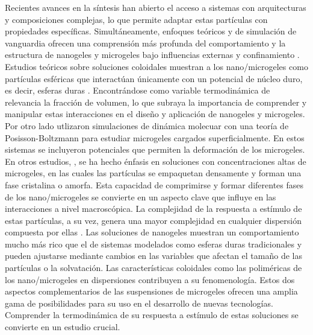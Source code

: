 	Recientes avances en la s\'intesis han abierto el acceso a sistemas con arquitecturas y composiciones complejas, lo que permite adaptar estas part\'iculas con propiedades espec\'ificas. 
	Simult\'aneamente, enfoques te\'oricos y de simulaci\'on de vanguardia ofrecen una comprensi\'on m\'as profunda del comportamiento y la estructura de nanogeles y microgeles bajo influencias externas y confinamiento \cite{perez2021thermodynamic,scotti2022softness,urich2016swelling}. 
	Estudios te\'oricos sobre soluciones coloidales muestran a los nano/microgeles como part\'iculas esf\'ericas que interact\'uan \'unicamente con un potencial de n\'ucleo duro, es decir, esferas duras \cite{karg2019nanogels}. Encontr\'andose como variable termodin\'amica de relevancia la fracci\'on de volumen, lo que subraya la importancia de comprender y manipular estas interacciones en el dise\~no y aplicaci\'on de nanogeles y microgeles.
	Por otro lado \citet{alziyadi2023osmotic} utlizaron simulaciones de din\'amica molecuar con una teor\'ia de Posisson-Boltzmann para estudiar microgeles cargados superficialmente. En estos sistemas se incluyeron potenciales que permiten la deformaci\'on de los microgeles.
	En otros estudios, \cite{scotti2022softness,scheffold2020pathways}, se ha hecho \'enfasis en soluciones con concentraciones altas de microgeles, en las cuales  las part\'iculas se empaquetan densamente y forman una fase cristalina o amorfa. Esta capacidad de comprimirse y formar diferentes fases de los nano/microgeles se convierte en un aspecto clave que influye en las interacciones a nivel macrosc\'opica.
	La complejidad de la respuesta a est\'imulo de estas part\'iculas, a su vez, genera una mayor complejidad en cualquier dispersi\'on compuesta por ellas \cite{lyon2012polymer}. Las soluciones de nanogeles muestran un comportamiento mucho m\'as rico que el de sistemas modelados como esferas duras tradicionales y pueden ajustarse mediante cambios en las variables que afectan el tama\~no de las part\'iculas o la solvataci\'on.
	Las caracter\'isticas coloidales como las polim\'ericas de los nano/microgeles en dispersiones contribuyen a su fenomenolog\'ia.
	Estos dos aspectos complementarios de las suspensiones de microgeles ofrecen una amplia gama de posibilidades para su uso en el desarrollo de nuevas tecnolog\'ias. 
	Comprender la termodin\'amica de su respuesta a est\'imulo de estas soluciones se convierte en un estudio crucial.
	
